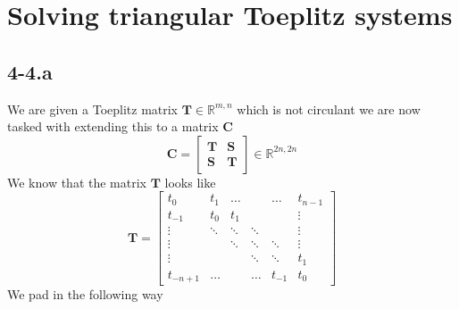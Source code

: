 \documentclass{article}
\begin{document}
\section*{Solving triangular Toeplitz systems}
\subsection*{4-4.a}
We are given a Toeplitz matrix $\mathbf{T} \in \mathbb{R}^{m,n}$ which is not circulant we are now tasked with extending this to a matrix $\mathbf{C}$ 
\begin{equation*}
    \mathbf{C}= \begin{bmatrix}
       \mathbf{T} & \mathbf{S} \\
       \mathbf{S} & \mathbf{T}
    \end{bmatrix} \in \mathbb{R}^{2n,2n}
\end{equation*}
We know that the matrix $\mathbf{T}$ looks like
\begin{equation*}
    \mathbf{T} = 
    \begin{bmatrix}
        t_{0} & t_{1} & \dots & & \dots & t_{n-1} \\
        t_{-1} & t_{0} & t_{1} & & & \vdots \\ 
        \vdots & \ddots &\ddots & \ddots & & \vdots \\
        \vdots & & \ddots & \ddots & \ddots & \vdots \\
        \vdots & & & \ddots & \ddots & t_{1} \\
        t_{- n + 1} & \dots & & \dots & t_{-1} & t_{0}
    \end{bmatrix}
\end{equation*}
We pad in the following way
\end{document}
